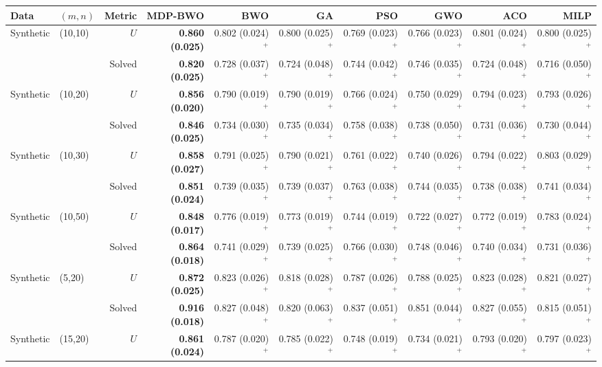 \begin{tabular}{llrrrrrrrr}\toprule
Data & $(m,n)$ & Metric & MDP-BWO & BWO & GA & PSO & GWO & ACO & MILP\\\midrule
Synthetic & (10,10) & $U$ & \textbf{0.860 (0.025)} & 0.802 (0.024)$^{+}$ & 0.800 (0.025)$^{+}$ & 0.769 (0.023)$^{+}$ & 0.766 (0.023)$^{+}$ & 0.801 (0.024)$^{+}$ & 0.800 (0.025)$^{+}$\\
 &  & Solved & \textbf{0.820 (0.025)} & 0.728 (0.037)$^{+}$ & 0.724 (0.048)$^{+}$ & 0.744 (0.042)$^{+}$ & 0.746 (0.035)$^{+}$ & 0.724 (0.048)$^{+}$ & 0.716 (0.050)$^{+}$\\
Synthetic & (10,20) & $U$ & \textbf{0.856 (0.020)} & 0.790 (0.019)$^{+}$ & 0.790 (0.019)$^{+}$ & 0.766 (0.024)$^{+}$ & 0.750 (0.029)$^{+}$ & 0.794 (0.023)$^{+}$ & 0.793 (0.026)$^{+}$\\
 &  & Solved & \textbf{0.846 (0.025)} & 0.734 (0.030)$^{+}$ & 0.735 (0.034)$^{+}$ & 0.758 (0.038)$^{+}$ & 0.738 (0.050)$^{+}$ & 0.731 (0.036)$^{+}$ & 0.730 (0.044)$^{+}$\\
Synthetic & (10,30) & $U$ & \textbf{0.858 (0.027)} & 0.791 (0.025)$^{+}$ & 0.790 (0.021)$^{+}$ & 0.761 (0.022)$^{+}$ & 0.740 (0.026)$^{+}$ & 0.794 (0.022)$^{+}$ & 0.803 (0.029)$^{+}$\\
 &  & Solved & \textbf{0.851 (0.024)} & 0.739 (0.035)$^{+}$ & 0.739 (0.037)$^{+}$ & 0.763 (0.038)$^{+}$ & 0.744 (0.035)$^{+}$ & 0.738 (0.038)$^{+}$ & 0.741 (0.034)$^{+}$\\
Synthetic & (10,50) & $U$ & \textbf{0.848 (0.017)} & 0.776 (0.019)$^{+}$ & 0.773 (0.019)$^{+}$ & 0.744 (0.019)$^{+}$ & 0.722 (0.027)$^{+}$ & 0.772 (0.019)$^{+}$ & 0.783 (0.024)$^{+}$\\
 &  & Solved & \textbf{0.864 (0.018)} & 0.741 (0.029)$^{+}$ & 0.739 (0.025)$^{+}$ & 0.766 (0.030)$^{+}$ & 0.748 (0.046)$^{+}$ & 0.740 (0.034)$^{+}$ & 0.731 (0.036)$^{+}$\\
Synthetic & (5,20) & $U$ & \textbf{0.872 (0.025)} & 0.823 (0.026)$^{+}$ & 0.818 (0.028)$^{+}$ & 0.787 (0.026)$^{+}$ & 0.788 (0.025)$^{+}$ & 0.823 (0.028)$^{+}$ & 0.821 (0.027)$^{+}$\\
 &  & Solved & \textbf{0.916 (0.018)} & 0.827 (0.048)$^{+}$ & 0.820 (0.063)$^{+}$ & 0.837 (0.051)$^{+}$ & 0.851 (0.044)$^{+}$ & 0.827 (0.055)$^{+}$ & 0.815 (0.051)$^{+}$\\
Synthetic & (15,20) & $U$ & \textbf{0.861 (0.024)} & 0.787 (0.020)$^{+}$ & 0.785 (0.022)$^{+}$ & 0.748 (0.019)$^{+}$ & 0.734 (0.021)$^{+}$ & 0.793 (0.020)$^{+}$ & 0.797 (0.023)$^{+}$\\

\end{tabular}
